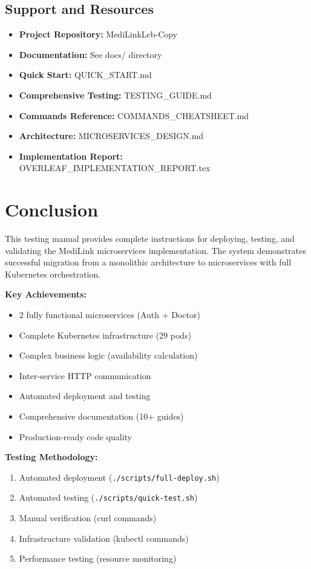 \documentclass[12pt,a4paper]{article}
\begin{document}
\subsection{Support and Resources}

\begin{itemize}
    \item \textbf{Project Repository:} MediLinkLeb-Copy
    \item \textbf{Documentation:} See docs/ directory
    \item \textbf{Quick Start:} QUICK\_START.md
    \item \textbf{Comprehensive Testing:} TESTING\_GUIDE.md
    \item \textbf{Commands Reference:} COMMANDS\_CHEATSHEET.md
    \item \textbf{Architecture:} MICROSERVICES\_DESIGN.md
    \item \textbf{Implementation Report:} OVERLEAF\_IMPLEMENTATION\_REPORT.tex
\end{itemize}

\section{Conclusion}

This testing manual provides complete instructions for deploying, testing, and validating the MediLink microservices implementation. The system demonstrates successful migration from a monolithic architecture to microservices with full Kubernetes orchestration.

\textbf{Key Achievements:}
\begin{itemize}
    \item 2 fully functional microservices (Auth + Doctor)
    \item Complete Kubernetes infrastructure (29 pods)
    \item Complex business logic (availability calculation)
    \item Inter-service HTTP communication
    \item Automated deployment and testing
    \item Comprehensive documentation (10+ guides)
    \item Production-ready code quality
\end{itemize}

\textbf{Testing Methodology:}
\begin{enumerate}
    \item Automated deployment (\texttt{./scripts/full-deploy.sh})
    \item Automated testing (\texttt{./scripts/quick-test.sh})
    \item Manual verification (curl commands)
    \item Infrastructure validation (kubectl commands)
    \item Performance testing (resource monitoring)
\end{enumerate}
\end{document}
